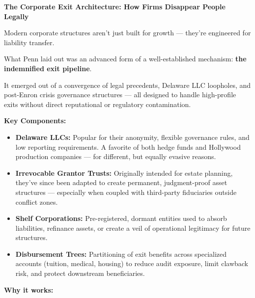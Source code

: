 \begin{HistoricalSidebar}{\textbf{The Corporate Exit Architecture: How Firms Disappear People Legally}}

    Modern corporate structures aren’t just built for growth — they’re engineered for 
    liability transfer.
    
    \medskip
    
    What Penn laid out was an advanced form of a well-established mechanism:  
    \textbf{the indemnified exit pipeline}.  
    
    It emerged out of a convergence of legal precedents, Delaware LLC loopholes, and post-Enron 
    crisis governance structures — all designed to handle high-profile exits without direct 
    reputational or regulatory contamination.
    
    \medskip
    
    \textbf{Key Components:}

    \medskip

    \begin{itemize}
      \item \textbf{Delaware LLCs:} Popular for their anonymity, flexible governance rules, and 
      low reporting requirements. A favorite of both hedge funds and Hollywood production companies — 
      for different, but equally evasive reasons.
      
      \item \textbf{Irrevocable Grantor Trusts:} Originally intended for estate planning, they’ve 
      since been adapted to create permanent, judgment-proof asset structures — especially when 
      coupled with third-party fiduciaries outside conflict zones.
    
      \item \textbf{Shelf Corporations:} Pre-registered, dormant entities used to absorb liabilities, 
      refinance assets, or create a veil of operational legitimacy for future structures.
    
      \item \textbf{Disbursement Trees:} Partitioning of exit benefits across specialized accounts 
      (tuition, medical, housing) to reduce audit exposure, limit clawback risk, and protect 
      downstream beneficiaries.
    
    \end{itemize}
    
    \medskip
    
    \textbf{Why it works:}

    \medskip
    

\end{HistoricalSidebar}
